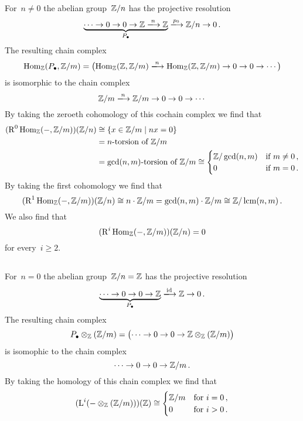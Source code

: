 For~$n \neq 0$ the abelian group~$\mathbb{Z}/n$ has the projective resolution
\[
  \underbrace{
  \dotsb
  \to
  0
  \to
  0
  \to
  \Integer
  \xlongto{n}
  \Integer
  }_{\Pcc}
  \xlongto{p_0}
  \Integer/n
  \to
  0 \,.
\]
The resulting chain complex
\[
  \Hom_\Integer(\Pcc, \Integer/m)
  =
  \bigl(
    \Hom_\Integer(\Integer,\Integer/m)
    \xlongto{n}
    \Hom_\Integer(\Integer,\Integer/m)
    \to
    0
    \to
    0
    \to
    \dotsb
  \bigr)
\]
is isomorphic to the chain complex
\[
  \Integer/m
  \xlongto{n}
  \Integer/m
  \to
  0
  \to
  0
  \to
  \dotsb
\]
By taking the zeroeth cohomology of this cochain complex we find that
\begin{align*}
  ( \Right^0 \Hom_\Integer(-,\Integer/m) )(\Integer/n)
  &\cong
  \{
  x \in \Integer/m
  \suchthat
  nx = 0  
  \}
  \\
  &=
  \text{\dash{$n$}{torsion} of~$\Integer/m$}
  \\
  &=
  \text{\dash{$\gcd(n,m)$}{torsion} of~$\Integer/m$}
  \cong
  \begin{cases}
    \Integer/\gcd(n,m)  & \text{if~$m \neq 0$}  \,, \\
    0                   & \text{if~$m = 0$}     \,.
  \end{cases}
\end{align*}
By taking the first cohomology we find that
\[
  ( \operatorname{R}^1 \operatorname{Hom}_{\mathbb{Z}}(-,\mathbb{Z}/m) )(\mathbb{Z}/n)
  \cong
  n \cdot \mathbb{Z}/m
  =
  \gcd(n,m) \cdot \mathbb{Z}/m
  \cong
  \mathbb{Z}/\operatorname{lcm}(n,m) \,.
\]
We also find that
\[
  ( \operatorname{R}^i \operatorname{Hom}_{\mathbb{Z}}(-,\mathbb{Z}/m) )(\mathbb{Z}/n)
  = 0
\]
for every~$i \geq 2$.





\subsection{}

For~$n = 0$ the abelian group~$\mathbb{Z}/n = \mathbb{Z}$ has the projective resolution
\[
  \underbrace{
  \dotsb
  \to
  0
  \to
  0
  \to
  \Integer
  }_{\Pcc}
  \xlongto{\id}
  \Integer
  \to
  0 \,.
\]
The resulting chain complex
\[
  P_\bullet \otimes_{\mathbb{Z}} (\mathbb{Z}/m)
  =
  \bigl(
  \dotsb
  \to
  0
  \to
  0
  \to
  \mathbb{Z} \otimes_{\mathbb{Z}} (\mathbb{Z}/m)
  \bigr)
\]
is isomophic to the chain complex
\[
  \dotsb
  \to
  0
  \to
  0
  \to
  \mathbb{Z}/m \,.
\]
By taking the homology of this chain complex we find that
\[
  ( \operatorname{L}^i (- \otimes_{\mathbb{Z}} (\mathbb{Z}/m)) )(\mathbb{Z})
  \cong
  \begin{cases}
    \mathbb{Z}/m  & \text{for~$i = 0$}  \,, \\
    0           & \text{for~$i > 0$}  \,.
  \end{cases}
\]

